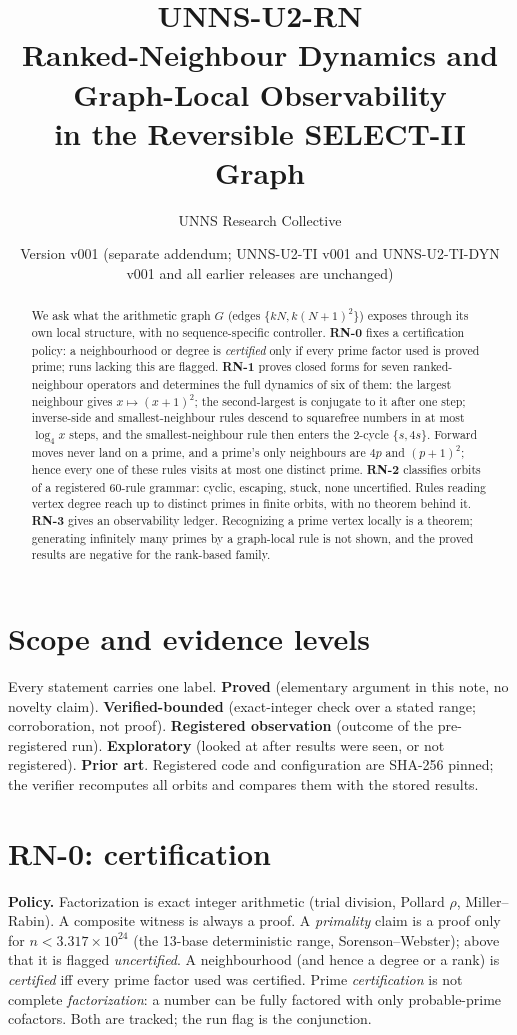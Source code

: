 \documentclass[11pt]{article}
\title{\textbf{UNNS-U2-RN}\\[2pt]\large Ranked-Neighbour Dynamics and Graph-Local Observability\\in the Reversible SELECT-II Graph}
\author{UNNS Research Collective}
\date{Version v001 \quad (separate addendum; UNNS-U2-TI v001 and UNNS-U2-TI-DYN v001 and all earlier releases are unchanged)}
\theoremstyle{remark}\newtheorem{remark}[theorem]{Remark}
\begin{document}
\maketitle
\begin{abstract}\noindent
We ask what the arithmetic graph $G$ (edges $\{kN,k(N+1)^2\}$) exposes through its own local structure, with no sequence-specific controller. \textbf{RN-0} fixes a certification policy: a neighbourhood or degree is \emph{certified} only if every prime factor used is proved prime; runs lacking this are flagged. \textbf{RN-1} proves closed forms for seven ranked-neighbour operators and determines the full dynamics of six of them: the largest neighbour gives $x\mapsto(x+1)^2$; the second-largest is conjugate to it after one step; inverse-side and smallest-neighbour rules descend to squarefree numbers in at most $\log_4 x$ steps, and the smallest-neighbour rule then enters the 2-cycle $\{s,4s\}$. Forward moves never land on a prime, and a prime's only neighbours are $4p$ and $(p+1)^2$; hence every one of these rules visits at most one distinct prime. \textbf{RN-2} classifies \Orbits{} orbits of a registered 60-rule grammar: \Cyc{} cyclic, \Esc{} escaping, \Stuck{} stuck, none uncertified. Rules reading vertex degree reach up to \MaxPrimes{} distinct primes in finite orbits, with no theorem behind it. \textbf{RN-3} gives an observability ledger. Recognizing a prime vertex locally is a theorem; generating infinitely many primes by a graph-local rule is not shown, and the proved results are negative for the rank-based family.
\end{abstract}

\section{Scope and evidence levels}
Every statement carries one label. \textbf{Proved} (elementary argument in this note, no novelty claim). \textbf{Verified-bounded} (exact-integer check over a stated range; corroboration, not proof). \textbf{Registered observation} (outcome of the pre-registered run). \textbf{Exploratory} (looked at after results were seen, or not registered). \textbf{Prior art}. Registered code and configuration are SHA-256 pinned; the verifier recomputes all \Orbits{} orbits and compares them with the stored results.

\section{RN-0: certification}
\textbf{Policy.} Factorization is exact integer arithmetic (trial division, Pollard $\rho$, Miller--Rabin). A composite witness is always a proof. A \emph{primality} claim is a proof only for $n<3.317\times10^{24}$ (the 13-base deterministic range, Sorenson--Webster); above that it is flagged \emph{uncertified}. A neighbourhood (and hence a degree or a rank) is \emph{certified} iff every prime factor used was certified. Prime \emph{certification} is not complete \emph{factorization}: a number can be fully factored with only probable-prime cofactors. Both are tracked; the run flag is the conjunction.
\end{document}
